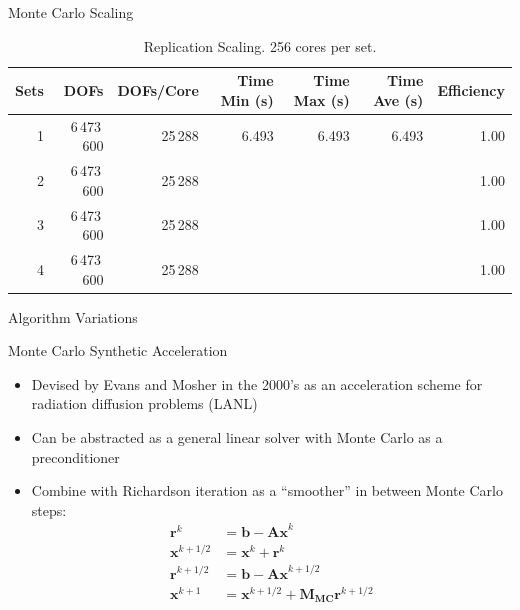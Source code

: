 \documentclass{beamer}
\begin{document}
\begin{frame}{Monte Carlo Scaling}
  \vspace{-0.2in}

  \begin{table}[htb!]
    \tiny
    \begin{center}
      \begin{tabular}{rrrrrrr}
        \toprule
        \multicolumn{1}{r}{Sets} &
        \multicolumn{1}{r}{DOFs} &
        \multicolumn{1}{r}{DOFs/Core} &
        \multicolumn{1}{r}{Time Min (s)} &
        \multicolumn{1}{r}{Time Max (s)} &
        \multicolumn{1}{r}{Time Ave (s)} &
        \multicolumn{1}{r}{Efficiency}
        \\ \midrule
        1 & 6\,473\,600 & 25\,288 & 6.493 & 6.493 & 6.493 & 1.00 \\
        2 & 6\,473\,600 & 25\,288 &  &  & & 1.00 \\
        3 & 6\,473\,600 & 25\,288 &  &  & & 1.00 \\
        4 & 6\,473\,600 & 25\,288 &  &  & & 1.00 \\
        \bottomrule
      \end{tabular}
    \end{center}
    \vspace{-0.09in}
    \caption{\small Replication Scaling. 256 cores per set.}
  \end{table} 

\end{frame}

\begin{frame}

  \center Algorithm Variations
  
\end{frame}

\begin{frame}{Monte Carlo Synthetic Acceleration}
  \begin{itemize}
  \item Devised by Evans and Mosher in the 2000's as an acceleration
    scheme for radiation diffusion problems (LANL)
    \vfill
  \item Can be abstracted as a general linear solver with Monte Carlo as a
    preconditioner
    \vfill
  \item Combine with Richardson iteration as a ``smoother'' in between
    Monte Carlo steps:
    \begin{align*}
      \mathbf{r}^k &= \mathbf{b} - \mathbf{Ax}^k \\
      \mathbf{x}^{k+1/2} &= \mathbf{x}^k + \mathbf{r}^k \\
      \mathbf{r}^{k+1/2} &= \mathbf{b} - \mathbf{Ax}^{k+1/2} \\
      \mathbf{x}^{k+1} &= \mathbf{x}^{k+1/2} + \mathbf{M_{MC}} \mathbf{r}^{k+1/2}
    \end{align*}
  \end{itemize}
\end{frame}
\end{document}
